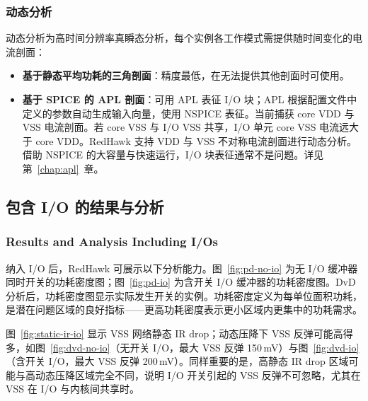 \subsubsection{动态分析}
动态分析为高时间分辨率真瞬态分析，每个实例各工作模式需提供随时间变化的电流剖面：
\begin{itemize}
  \item \textbf{基于静态平均功耗的三角剖面}：精度最低，在无法提供其他剖面时可使用。
  \item \textbf{基于 SPICE 的 APL 剖面}：可用 APL 表征 I/O 块；APL 根据配置文件中定义的参数自动生成输入向量，使用 NSPICE 表征。当前捕获 core VDD 与 VSS 电流剖面。若 core VSS 与 I/O VSS 共享，I/O 单元 core VSS 电流远大于 core VDD。RedHawk 支持 VDD 与 VSS 不对称电流剖面进行动态分析。借助 NSPICE 的大容量与快速运行，I/O 块表征通常不是问题。详见第~\ref{chap:apl}~章。
\end{itemize}

\subsection{包含 I/O 的结果与分析}
\subsubsection*{Results and Analysis Including I/Os}

纳入 I/O 后，RedHawk 可展示以下分析能力。图~\ref{fig:pd-no-io} 为无 I/O 缓冲器同时开关的功耗密度图；图~\ref{fig:pd-io} 为含开关 I/O 缓冲器的功耗密度图。DvD 分析后，功耗密度图显示实际发生开关的实例。功耗密度定义为每单位面积功耗，是潜在问题区域的良好指标——更高功耗密度表示更小区域内更集中的功耗需求。


图~\ref{fig:static-ir-io} 显示 VSS 网络静态 IR drop；动态压降下 VSS 反弹可能高得多，如图~\ref{fig:dvd-no-io}（无开关 I/O，最大 VSS 反弹 150\,mV）与图~\ref{fig:dvd-io}（含开关 I/O，最大 VSS 反弹 200\,mV）。同样重要的是，高静态 IR drop 区域可能与高动态压降区域完全不同，说明 I/O 开关引起的 VSS 反弹不可忽略，尤其在 VSS 在 I/O 与内核间共享时。

